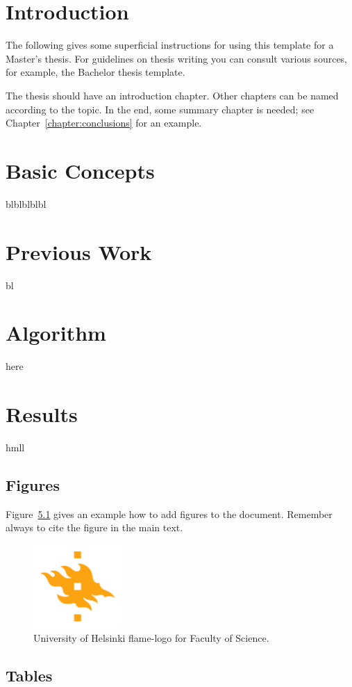 \chapter{Introduction}

The following gives some superficial instructions for using this template for a Master's thesis. For guidelines on thesis writing you can consult various sources, for example, the Bachelor thesis template.

The thesis should have an introduction chapter. Other chapters can be named according to the topic. In the end, some summary chapter is needed; see Chapter~\ref{chapter:conclusions} for an example.

\chapter{Basic Concepts}
blblblblbl
\chapter{Previous Work}
bl
\chapter{Algorithm}
here
\chapter{Results}
hmll
\section{Figures}
Figure~\ref{fig:logo} gives an example how to add figures to the document. Remember always to cite the figure in the main text.

\begin{figure}[h!] 
\centering 
\includegraphics[width=0.3\textwidth]{HY-logo-ml.png}
\caption{University of Helsinki flame-logo for Faculty of Science.\label{fig:logo}}
\end{figure}

\section{Tables}


